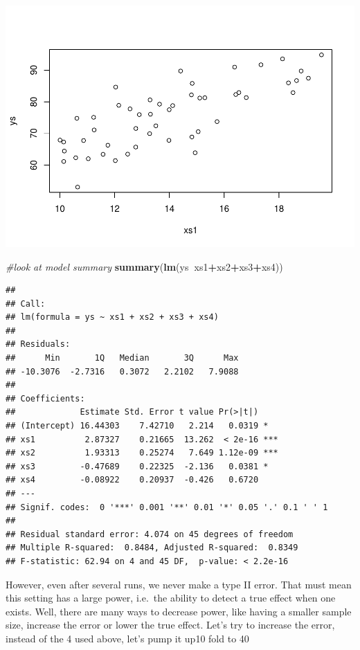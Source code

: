 \documentclass[
]{book}
\newenvironment{Shaded}{\begin{snugshade}}{\end{snugshade}}
\newcommand{\CommentTok}[1]{\textcolor[rgb]{0.56,0.35,0.01}{\textit{#1}}}
\newcommand{\KeywordTok}[1]{\textcolor[rgb]{0.13,0.29,0.53}{\textbf{#1}}}
\newcommand{\NormalTok}[1]{#1}
\newcommand{\OperatorTok}[1]{\textcolor[rgb]{0.81,0.36,0.00}{\textbf{#1}}}
\begin{document}
\includegraphics{ECOMODbook_files/figure-latex/a7.4-1.pdf}

\begin{Shaded}
\begin{Highlighting}[]
\CommentTok{#look at model summary}
\KeywordTok{summary}\NormalTok{(}\KeywordTok{lm}\NormalTok{(ys}\OperatorTok{~}\NormalTok{xs1}\OperatorTok{+}\NormalTok{xs2}\OperatorTok{+}\NormalTok{xs3}\OperatorTok{+}\NormalTok{xs4))}
\end{Highlighting}
\end{Shaded}

\begin{verbatim}
## 
## Call:
## lm(formula = ys ~ xs1 + xs2 + xs3 + xs4)
## 
## Residuals:
##      Min       1Q   Median       3Q      Max 
## -10.3076  -2.7316   0.3072   2.2102   7.9088 
## 
## Coefficients:
##             Estimate Std. Error t value Pr(>|t|)    
## (Intercept) 16.44303    7.42710   2.214   0.0319 *  
## xs1          2.87327    0.21665  13.262  < 2e-16 ***
## xs2          1.93313    0.25274   7.649 1.12e-09 ***
## xs3         -0.47689    0.22325  -2.136   0.0381 *  
## xs4         -0.08922    0.20937  -0.426   0.6720    
## ---
## Signif. codes:  0 '***' 0.001 '**' 0.01 '*' 0.05 '.' 0.1 ' ' 1
## 
## Residual standard error: 4.074 on 45 degrees of freedom
## Multiple R-squared:  0.8484,	Adjusted R-squared:  0.8349 
## F-statistic: 62.94 on 4 and 45 DF,  p-value: < 2.2e-16
\end{verbatim}

However, even after several runs, we never make a type II error. That must mean this setting has a large power, i.e.~the ability to detect a true effect when one exists. Well, there are many ways to decrease power, like having a smaller sample size, increase the error or lower the true effect. Let's try to increase the error, instead of the 4 used above, let's pump it up10 fold to 40
\end{document}
